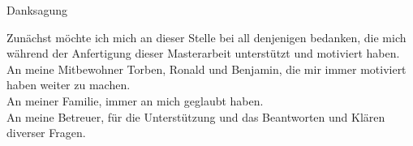 

\vspace*{\fill}

\begin{center}


\begin{LARGE}
Danksagung
\end{LARGE}

\hspace{5cm}

Zunächst möchte ich mich an dieser Stelle bei all denjenigen bedanken, die mich während der Anfertigung dieser Masterarbeit unterstützt und motiviert haben.\\

An meine Mitbewohner Torben, Ronald und Benjamin, die mir immer motiviert haben weiter zu machen.\\

An meiner Familie, immer an mich geglaubt haben.\\

An meine Betreuer, für die Unterstützung und das Beantworten und Klären diverser Fragen.


\end{center}


\vspace*{\fill}